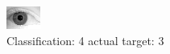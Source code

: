 \begin{figure}[h!]
\begin{center}
\includegraphics[width=0.60\columnwidth]{figures/ID2208_class_4_target_3.png}
\end{center}
\caption{ Classification: 4 actual target: 3}
\label{fig:ID2208_class_4_target_3}
\end{figure}
